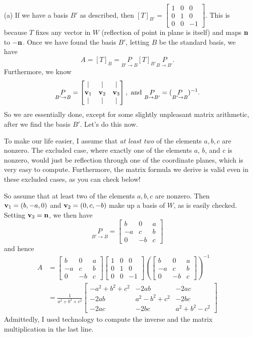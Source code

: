 \begin{solution}
\noindent (a)  If we have a basis $B'$ as described, then $[T]_{B'}=\begin{bmatrix}
1&0&0\\
0&1&0\\
0&0&-1
\end{bmatrix}$. This is because $T$ fixes any vector in $W$ (reflection of point in plane is itself) and maps ${\mathbf n}$ to $-{\mathbf n}$. Once we have found the basis $B'$, letting $B$ be the standard basis, we have 
\[
A=[T]_B=\underset{B'\rightarrow B}{P}[T]_{B'}\underset{B\rightarrow B'}{P}.
\]
Furthermore, we know 
\[
\underset{B'\rightarrow B}{P}=\begin{bmatrix}
\vert&\vert&\vert\\
{\mathbf v}_1&{\mathbf v}_2&{\mathbf v}_3\\
\vert&\vert&\vert
\end{bmatrix}, \text{ and } \underset{B\rightarrow B'}{P}=(\underset{B'\rightarrow B}{P})^{-1}.
\]
So we are essentially done, except for some slightly unpleasant matrix arithmetic, after we find the basis $B'$. Let's do this now. 

To make our life easier, I assume that {\em at least two} of the elements $a, b, c$ are nonzero. The excluded case,  where exactly one of the elements $a$, $b$, and $c$ is nonzero,  would just be reflection through one of the coordinate planes, which is very easy to compute. Furthermore, the matrix formula we derive is valid even in these excluded cases, as you can check below! 

So assume that at least two of the elements $a,b,c$ are nonzero. Then ${\mathbf v}_1=(b,-a,0)$ and ${\mathbf v}_2=(0,c,-b)$ make up a basis of $W$, as is easily checked.  Setting ${\mathbf v}_3={\mathbf n}$, we then have 
\[
\underset{B'\rightarrow B}{P}=\begin{bmatrix}
b&0&a\\
-a&c&b\\
0&-b&c
\end{bmatrix}
\]
and hence 
\begin{align*}
A&=\begin{bmatrix}
b&0&a\\
-a&c&b\\
0&-b&c
\end{bmatrix}
\begin{bmatrix}
1&0&0\\
0&1&0\\
0&0&-1
\end{bmatrix}
\left(\begin{bmatrix}
b&0&a\\
-a&c&b\\
0&-b&c
\end{bmatrix}
\right)^{-1}\\
&=\frac{1}{a^2+b^2+c^2}\begin{bmatrix}
-a^2+b^2+c^2&-2ab&-2ac\\
-2ab&a^2-b^2+c^2&-2bc\\
-2ac&-2bc&a^2+b^2-c^2
\end{bmatrix}
\end{align*}
Admittedly, I used technology to compute the inverse and the matrix multiplication in the last line. 
\end{solution}
